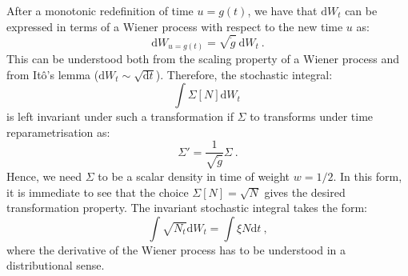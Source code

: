 \documentclass[amsmath,amssymb,11pt]{article}
\begin{document}
After a monotonic redefinition of time $u=g(t)$, we have that $\text{d}W_t$ can be expressed in terms of a Wiener process with respect to the new time $u$ as:
\begin{equation}
    \mathrm{d}W_{u=g(t)}= \sqrt{\dot{g}} \  \mathrm{d}W_{t} \ .
\end{equation}
This can be understood both from the scaling property of a Wiener process and from It\^{o}'s lemma ($\text{d}W_t \sim \sqrt{\text{d}t}$). Therefore, the stochastic integral:
\begin{equation}
    \int \Sigma[N] \text{d}W_t \ 
\end{equation}
is left invariant under such a transformation if $\Sigma$ to transforms under time reparametrisation as:
\begin{equation}
    \Sigma' = \frac{1}{\sqrt{\dot{g}}} \Sigma \ .
\end{equation}
Hence, we need $\Sigma$ to be a scalar density in time of weight $w=1/2$. In this form, it is immediate to see that the choice $\Sigma[N]= \sqrt{N}$ gives the desired transformation property. The invariant stochastic integral takes the form:
\begin{equation}
    \int \sqrt{N_t} \text{d}W_t = \int \xi N \text{d}t \ ,
\end{equation}
where the derivative of the Wiener process has to be understood in a distributional sense.
\end{document}

